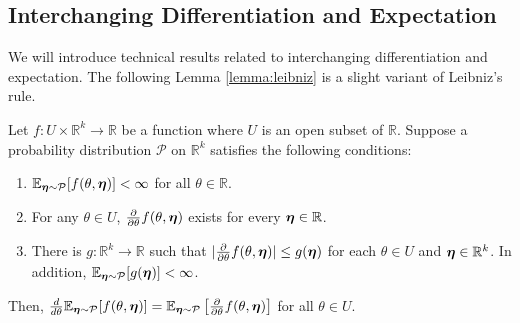 \subsection{Interchanging Differentiation and Expectation}\label{appendix:leibniz}
We will introduce technical results related to interchanging differentiation and expectation. The following Lemma \ref{lemma:leibniz} is a slight variant of Leibniz's rule.
\begin{lemma}\label{lemma:leibniz}
Let $f : U \times \mathbb{R}^k \rightarrow \mathbb{R}$ be a function where $U$ is an open subset of $\mathbb{R}$. Suppose a probability distribution $\mathcal{P}$ on $\mathbb{R}^k$  satisfies the following conditions:
\begin{enumerate}
\item $\mathbb{E}_{{\bm{\eta}} \sim \mathcal{P}}[f(\theta, {\bm{\eta}})] < \infty$ for all $\theta \in \mathbb{R}$.
\item For any $\theta \in U$, $\frac{\partial}{\partial \theta}f(\theta,{\bm{\eta}})$ exists for every ${\bm{\eta}} \in \mathbb{R}$.
\item There is $g: \mathbb{R}^k \rightarrow \mathbb{R}$ such that $|\frac{\partial}{\partial \theta}f(\theta,{\bm{\eta}})| \leq g({\bm{\eta}})$ for each $\theta \in U$ and ${\bm{\eta}} \in \mathbb{R}^k$. In addition, $ \mathbb{E}_{{\bm{\eta}} \sim \mathcal{P}}[g({\bm{\eta}})] < \infty$.
\end{enumerate}
Then, $\frac{d}{d\theta} \mathbb{E}_{{\bm{\eta}} \sim \mathcal{P}}[f(\theta, {\bm{\eta}})] = \mathbb{E}_{{\bm{\eta}} \sim \mathcal{P}}\left[ \frac{\partial}{\partial \theta}f(\theta,{\bm{\eta}})\right]$ for all $\theta \in U$.
\end{lemma}

